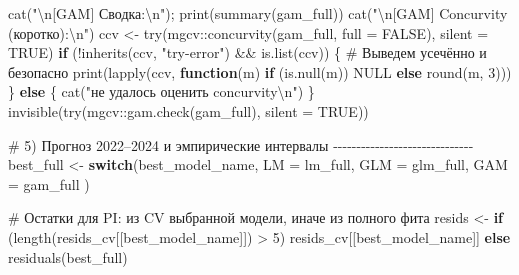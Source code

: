 \documentclass[
  letterpaper,
  DIV=11,
  numbers=noendperiod]{scrreprt}
\newenvironment{Shaded}{\begin{snugshade}}{\end{snugshade}}
\newcommand{\AttributeTok}[1]{\textcolor[rgb]{0.40,0.45,0.13}{#1}}
\newcommand{\CommentTok}[1]{\textcolor[rgb]{0.37,0.37,0.37}{#1}}
\newcommand{\ConstantTok}[1]{\textcolor[rgb]{0.56,0.35,0.01}{#1}}
\newcommand{\ControlFlowTok}[1]{\textcolor[rgb]{0.00,0.23,0.31}{\textbf{#1}}}
\newcommand{\DecValTok}[1]{\textcolor[rgb]{0.68,0.00,0.00}{#1}}
\newcommand{\FunctionTok}[1]{\textcolor[rgb]{0.28,0.35,0.67}{#1}}
\newcommand{\NormalTok}[1]{\textcolor[rgb]{0.00,0.23,0.31}{#1}}
\newcommand{\OtherTok}[1]{\textcolor[rgb]{0.00,0.23,0.31}{#1}}
\newcommand{\SpecialCharTok}[1]{\textcolor[rgb]{0.37,0.37,0.37}{#1}}
\newcommand{\StringTok}[1]{\textcolor[rgb]{0.13,0.47,0.30}{#1}}
\begin{document}
\begin{Shaded}
\begin{Highlighting}[]
\FunctionTok{cat}\NormalTok{(}\StringTok{"}\SpecialCharTok{\textbackslash{}n}\StringTok{[GAM] Сводка:}\SpecialCharTok{\textbackslash{}n}\StringTok{"}\NormalTok{); }\FunctionTok{print}\NormalTok{(}\FunctionTok{summary}\NormalTok{(gam\_full))}
\FunctionTok{cat}\NormalTok{(}\StringTok{"}\SpecialCharTok{\textbackslash{}n}\StringTok{[GAM] Concurvity (коротко):}\SpecialCharTok{\textbackslash{}n}\StringTok{"}\NormalTok{)}
\NormalTok{ccv }\OtherTok{\textless{}{-}} \FunctionTok{try}\NormalTok{(mgcv}\SpecialCharTok{::}\FunctionTok{concurvity}\NormalTok{(gam\_full, }\AttributeTok{full =} \ConstantTok{FALSE}\NormalTok{), }\AttributeTok{silent =} \ConstantTok{TRUE}\NormalTok{)}
\ControlFlowTok{if}\NormalTok{ (}\SpecialCharTok{!}\FunctionTok{inherits}\NormalTok{(ccv, }\StringTok{"try{-}error"}\NormalTok{) }\SpecialCharTok{\&\&} \FunctionTok{is.list}\NormalTok{(ccv)) \{}
  \CommentTok{\# Выведем усечённо и безопасно}
  \FunctionTok{print}\NormalTok{(}\FunctionTok{lapply}\NormalTok{(ccv, }\ControlFlowTok{function}\NormalTok{(m) }\ControlFlowTok{if}\NormalTok{ (}\FunctionTok{is.null}\NormalTok{(m)) }\ConstantTok{NULL} \ControlFlowTok{else} \FunctionTok{round}\NormalTok{(m, }\DecValTok{3}\NormalTok{)))}
\NormalTok{\} }\ControlFlowTok{else}\NormalTok{ \{}
  \FunctionTok{cat}\NormalTok{(}\StringTok{"не удалось оценить concurvity}\SpecialCharTok{\textbackslash{}n}\StringTok{"}\NormalTok{)}
\NormalTok{\}}
\FunctionTok{invisible}\NormalTok{(}\FunctionTok{try}\NormalTok{(mgcv}\SpecialCharTok{::}\FunctionTok{gam.check}\NormalTok{(gam\_full), }\AttributeTok{silent =} \ConstantTok{TRUE}\NormalTok{))}


\CommentTok{\# 5) Прогноз 2022–2024 и эмпирические интервалы {-}{-}{-}{-}{-}{-}{-}{-}{-}{-}{-}{-}{-}{-}{-}{-}{-}{-}{-}{-}{-}{-}{-}{-}{-}{-}{-}{-}{-}{-}}
\NormalTok{best\_full }\OtherTok{\textless{}{-}} \ControlFlowTok{switch}\NormalTok{(best\_model\_name,}
  \AttributeTok{LM  =}\NormalTok{ lm\_full,}
  \AttributeTok{GLM =}\NormalTok{ glm\_full,}
  \AttributeTok{GAM =}\NormalTok{ gam\_full}
\NormalTok{)}

\CommentTok{\# Остатки для PI: из CV выбранной модели, иначе из полного фита}
\NormalTok{resids }\OtherTok{\textless{}{-}} \ControlFlowTok{if}\NormalTok{ (}\FunctionTok{length}\NormalTok{(resids\_cv[[best\_model\_name]]) }\SpecialCharTok{\textgreater{}} \DecValTok{5}\NormalTok{) resids\_cv[[best\_model\_name]] }\ControlFlowTok{else} \FunctionTok{residuals}\NormalTok{(best\_full)}


\end{Highlighting}
\end{Shaded}
\end{document}

